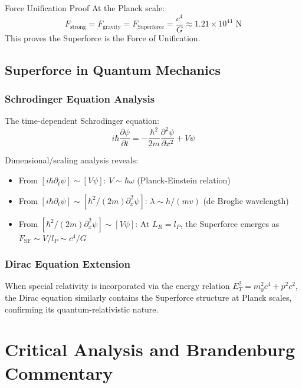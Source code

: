 \begin{frameworkclaim}{Force Unification Proof}
At the Planck scale:
\begin{equation}
F_{\text{strong}} = F_{\text{gravity}} = F_{\text{Superforce}} = \frac{c^4}{G} \approx 1.21 \times 10^{44} \text{ N}
\end{equation}
This proves the Superforce is the Force of Unification.
\end{frameworkclaim}

\subsection{Superforce in Quantum Mechanics}

\subsubsection{Schrodinger Equation Analysis}

The time-dependent Schrodinger equation:
\begin{equation}
i\hbar \frac{\partial \psi}{\partial t} = -\frac{\hbar^2}{2m}\frac{\partial^2 \psi}{\partial x^2} + V\psi
\end{equation}

Dimensional/scaling analysis reveals:
\begin{itemize}
\item From $[i\hbar\partial_t\psi] \sim [V\psi]$: $V \sim \hbar\omega$ (Planck-Einstein relation)
\item From $[i\hbar\partial_t\psi] \sim [\hbar^2/(2m)\partial_x^2\psi]$: $\lambda \sim h/(mv)$ (de Broglie wavelength)
\item From $[\hbar^2/(2m)\partial_x^2\psi] \sim [V\psi]$: At $L_R = l_P$, the Superforce emerges as $F_{\text{SF}} \sim V/l_P \sim c^4/G$
\end{itemize}

\subsubsection{Dirac Equation Extension}

When special relativity is incorporated via the energy relation $E_T^2 = m_0^2c^4 + p^2c^2$, the Dirac equation similarly contains the Superforce structure at Planck scales, confirming its quantum-relativistic nature.

\section{Critical Analysis and Brandenburg Commentary}

